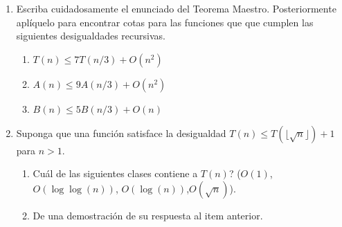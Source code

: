\documentclass[12pt, a4paper]{article}
\begin{document}
\begin{enumerate}
\item Escriba cuidadosamente el enunciado del Teorema Maestro. Posteriormente aplíquelo para encontrar cotas para las funciones que que cumplen las siguientes desigualdades recursivas.

\begin{enumerate}
\item $T(n)\leq 7T(n/3)+O(n^2)$
\item $A(n)\leq 9A(n/3)+O(n^2)$
\item $B(n)\leq 5B(n/3)+O(n)$
\end{enumerate}

\item Suponga que una función satisface la desigualdad $T(n)\leq T(\lfloor \sqrt{n}\rfloor)+1$ para $n>1$. 
\begin{enumerate}
\item Cuál de las siguientes clases contiene a $T(n)$? ($O(1)$, $O(\log\log(n))$, $O(\log(n))$,$O(\sqrt{n})$).
\item De una demostración de su respuesta al item anterior.
\end{enumerate}

\end{enumerate}
\end{document}

